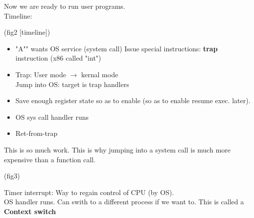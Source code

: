 Now we are ready to run user programs.\\

Timeline:

(fig2 [timeline])\\

\begin{itemize}
    \item "A"" wants OS service (system call)
        Issue special instructions: \textbf{trap} instruction
        (x86 called "int")

    \item    Trap: User mode $\rightarrow$ kernal mode\\
        Jump into OS: target is trap handlers

    \item   Save enough register state so as to enable (so as to 
        enable resume exec. later).

    \item   OS sys call handler runs

    \item  Ret-from-trap
\end{itemize}

This is so much work. This is why jumping into a system call
is much more expensive than a function call.

(fig3)

Timer interrupt: Way to regain control of CPU (by OS). \\

OS handler runs. Can swith to a different process if we want to.
This is called a \textbf{Context switch}
